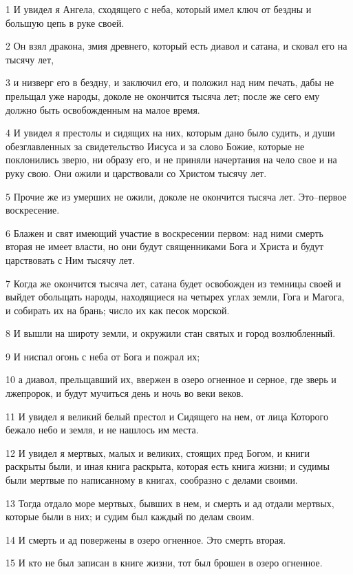 \par 1 И увидел я Ангела, сходящего с неба, который имел ключ от бездны и большую цепь в руке своей.
\par 2 Он взял дракона, змия древнего, который есть диавол и сатана, и сковал его на тысячу лет,
\par 3 и низверг его в бездну, и заключил его, и положил над ним печать, дабы не прельщал уже народы, доколе не окончится тысяча лет; после же сего ему должно быть освобожденным на малое время.
\par 4 И увидел я престолы и сидящих на них, которым дано было судить, и души обезглавленных за свидетельство Иисуса и за слово Божие, которые не поклонились зверю, ни образу его, и не приняли начертания на чело свое и на руку свою. Они ожили и царствовали со Христом тысячу лет.
\par 5 Прочие же из умерших не ожили, доколе не окончится тысяча лет. Это--первое воскресение.
\par 6 Блажен и свят имеющий участие в воскресении первом: над ними смерть вторая не имеет власти, но они будут священниками Бога и Христа и будут царствовать с Ним тысячу лет.
\par 7 Когда же окончится тысяча лет, сатана будет освобожден из темницы своей и выйдет обольщать народы, находящиеся на четырех углах земли, Гога и Магога, и собирать их на брань; число их как песок морской.
\par 8 И вышли на широту земли, и окружили стан святых и город возлюбленный.
\par 9 И ниспал огонь с неба от Бога и пожрал их;
\par 10 а диавол, прельщавший их, ввержен в озеро огненное и серное, где зверь и лжепророк, и будут мучиться день и ночь во веки веков.
\par 11 И увидел я великий белый престол и Сидящего на нем, от лица Которого бежало небо и земля, и не нашлось им места.
\par 12 И увидел я мертвых, малых и великих, стоящих пред Богом, и книги раскрыты были, и иная книга раскрыта, которая есть книга жизни; и судимы были мертвые по написанному в книгах, сообразно с делами своими.
\par 13 Тогда отдало море мертвых, бывших в нем, и смерть и ад отдали мертвых, которые были в них; и судим был каждый по делам своим.
\par 14 И смерть и ад повержены в озеро огненное. Это смерть вторая.
\par 15 И кто не был записан в книге жизни, тот был брошен в озеро огненное.

